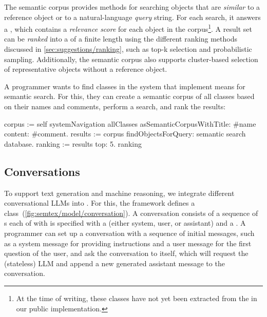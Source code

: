 The semantic corpus provides methods for searching objects that are \emph{similar} to a reference object or to a natural-language \emph{query} string.
For each search, it answers a , which contains a \emph{relevance score} for each object in the corpus\footnote{At the time of writing, these classes have not yet been extracted from the  in our public implementation.}.
A result set can be \emph{ranked} into a  of a finite length using the different ranking methods discussed in \cref{sec:suggestions/ranking}, such as top-k selection and probabilistic sampling.
Additionally, the semantic corpus also supports cluster-based selection of representative objects without a reference object.

\begin{example}[5]
	A programmer wants to find classes in the system that implement means for semantic search.
	For this, they can create a semantic corpus of all classes based on their names and comments, perform a search, and rank the results:

	\begin{multicode}
		corpus := self systemNavigation allClasses \newline
		\null\qquad	asSemanticCorpusWithTitle: \#name \newline
		\null\qquad	content: \#comment. \newline
		results := corpus findObjectsForQuery: \textquotesingle semantic search database\textquotesingle. \newline
		ranking := results top: 5. \newline
		ranking 
	\end{multicode}
\end{example}

\FloatBarrier

\subsection*{Conversations}
\label{sec:semtex/model/conversations}

To support text generation and machine reasoning, we integrate different conversational LLMs into \semtex.
For this, the framework defines a  class~(\cref{fig:semtex/model/conversation}).
A conversation consists of a sequence of s each of with is specified with a  (either system, user, or assistant) and a .
A programmer can set up a conversation with a sequence of initial messages, such as a system message for providing instructions and a user message for the first question of the user, and ask the conversation to  itself, which will request the (stateless) LLM and append a new generated assistant message to the conversation.

